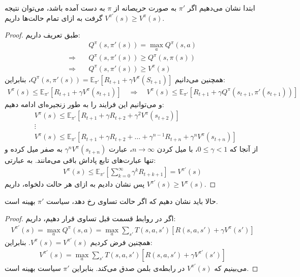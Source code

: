 \begin{ابجد}
\item ابتدا نشان می‌دهیم اگر $\pi'$ به صورت حریصانه از $\pi$ به دست آمده باشد، می‌توان نتیجه گرفت به ازای تمام حالت‌ها داریم $V^{\pi'}(s) \geq V^{\pi}(s)$.
\begin{proof}
    طبق تعریف داریم:
    \begin{align*}
                          & Q^{\pi}(s, \pi'(s)) = \max_a Q^{\pi}(s, a)  \\
        \Rightarrow \quad & Q^{\pi}(s, \pi'(s)) \geq Q^{\pi}(s, \pi(s)) \\
        \Rightarrow \quad & Q^{\pi}(s, \pi'(s)) \geq V^{\pi}(s)
    \end{align*}
    همچنین می‌دانیم $Q^{\pi}(s, \pi'(s)) = \mathbb{E}_{\pi'} [R_{t+1} + \gamma V^\pi(S_{t+1})]$، بنابراین:
    \begin{align*}
        V^{\pi}(s) \leq \mathbb{E}_{\pi'} [R_{t+1} + \gamma V^{\pi}(s_{t+1})] \quad \Rightarrow \quad V^{\pi}(s) \leq \mathbb{E}_{\pi'} [R_{t+1} + \gamma Q^{\pi}(s_{t+1}, \pi'(s_{t+1}))]
    \end{align*}
    و می‌توانیم این فرایند را به طور زنجیره‌ای ادامه دهیم:
    \begin{align*}
         & V^{\pi}(s) \leq \mathbb{E}_{\pi'} [R_{t+1} + \gamma R_{t+2} + \gamma^2 V^{\pi}(s_{t+2})]                               \\
         & \vdots                                                                                                                 \\
         & V^{\pi}(s) \leq \mathbb{E}_{\pi'} [R_{t+1} + \gamma R_{t+2} + \dots + \gamma^{n-1} R_{t+n} +\gamma^n V^{\pi}(s_{t+n})]
    \end{align*}
    از آنجا که $0 \leq \gamma < 1$، با میل کردن $n \to \infty$، عبارت $\gamma^n V^{\pi}(s_{t+n})$ به صفر میل کرده و تنها عبارت‌های تابع پاداش باقی می‌مانند. به عبارتی:
    \begin{align*}
        V^\pi(s) \le \mathbb{E}_{\pi'} [ \sum_{k=0}^{\infty} \gamma^k R_{t+k+1}] = V^{\pi'}(s)
    \end{align*}
    پس نشان دادیم به ازای هر حالت دلخواه، داریم $V^{\pi'}(s) \geq V^{\pi}(s)$.
\end{proof}

حالا باید نشان دهیم که اگر حالت تساوی رخ دهد، سیاست $\pi'$ بهینه است.
\begin{proof}
    اگر در روابط قسمت قبل تساوی قرار دهیم، داریم:
    \begin{align*}
        V^{\pi'}(s) = \max_a Q^{\pi}(s, a) = \max_a \sum_{s'}T(s, a, s')[R(s,a,s') + \gamma V^{\pi}(s')]
    \end{align*}
    همچنین فرض کردیم $V^{\pi}(s) = V^{\pi'}(s)$. بنابراین:
    \begin{align*}
        V^{\pi'}(s) = \max_a \sum_{s'}T(s, a, s')[R(s,a,s') + \gamma V^{\pi'}(s')]
    \end{align*}
    می‌بینیم که $V^{\pi'}(s)$ در رابطه‌ی بلمن صدق می‌کند. بنابراین $\pi'$ سیاست بهینه است.
\end{proof}

\end{ابجد}